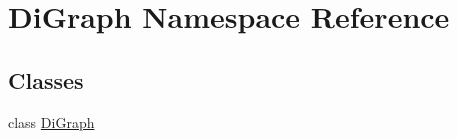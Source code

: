 \hypertarget{namespaceDiGraph}{}\section{Di\+Graph Namespace Reference}
\label{namespaceDiGraph}
\subsection*{Classes}
\begin{DoxyCompactItemize}
\item 
class \hyperlink{classDiGraph_1_1DiGraph}{Di\+Graph}
\end{DoxyCompactItemize}
